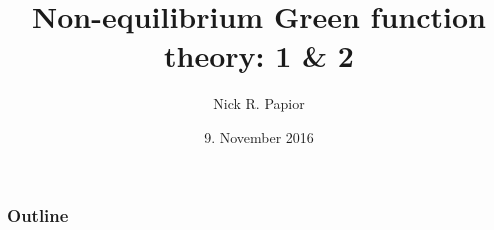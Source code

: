 


\graphicspath{{fig/}{fig-defence/}{paper-fig/}}
\usepackage[export]{adjustbox}


\usetikzlibrary{calc}

\usepackage{algorithm}
\usepackage{algpseudocode}

\date{9. November 2016}
\title{Non-equilibrium Green function theory: 1 \& 2}
\author{Nick R. Papior}

\usepackage{animate}



\begin{frame}
  \titlepage
\end{frame}

\begin{frame}
  \frametitle{Outline}
  \tableofcontents
\end{frame}


\def\matsize{.8cm}
\def\Full{\begin{tikzpicture}
      \fill (0,0) rectangle (\matsize,\matsize);
    \end{tikzpicture}
}
\def\Left{\begin{tikzpicture}
      \draw (0,0) rectangle (\matsize,\matsize);
      \fill (0,\matsize) rectangle ++(.3*\matsize,-.3*\matsize);
    \end{tikzpicture}
}
\def\FullLeft{\begin{tikzpicture}
      \draw (0,0) rectangle (\matsize,\matsize);
      \fill (0,0) rectangle (.3*\matsize,\matsize);
    \end{tikzpicture}
}

\def\drawcube[#1]{%
    \path[#1] (0,0,0) -- (0,0,1);
    \path[#1] (0,0,0) -- (1,0,0);
    \path[#1] (0,0,0) -- (0,1,0);
    \path[#1] (1,0,0) -- (1,1,0);
    \path[#1] (1,0,0) -- (1,0,1);
    \path[#1] (0,1,0) -- (1,1,0);
    \path[#1] (0,1,0) -- (0,1,1);
    \path[#1] (0,0,1) -- (1,0,1);
    \path[#1] (0,0,1) -- (0,1,1);
    \path[#1] (1,1,0) -- (1,1,1);
    \path[#1] (1,1,1) -- (0,1,1);
    \path[#1] (1,1,1) -- (1,0,1);
}








